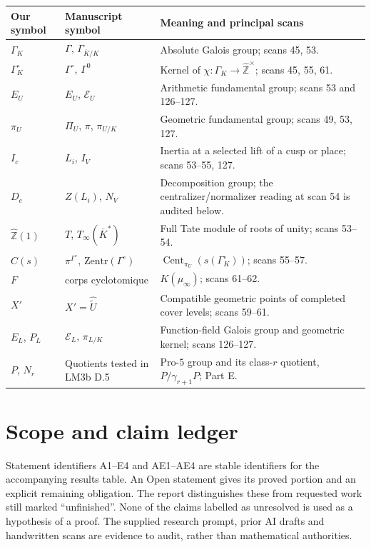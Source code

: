 \documentclass[11pt,a4paper]{article}
\newcommand{\Cent}{\operatorname{Cent}}
\newcommand{\Zhat}{\widehat{\mathbb Z}}
\begin{document}
\small
\begin{longtable}{>{\raggedright\arraybackslash}p{}>{\raggedright\arraybackslash}p{}>{\raggedright\arraybackslash}p{}}
\toprule Our symbol & Manuscript symbol & Meaning and principal scans\\\midrule\endhead
$\Gamma_K$ & $\Gamma$, $\Gamma_{\overline K/K}$ & Absolute Galois group; scans 45, 53.\\
$\Gamma_K^\circ$ & $\Gamma^\circ$, $\Gamma^0$ & Kernel of $\chi:\Gamma_K\to\Zhat^\times$; scans 45, 55, 61.\\
$E_U$ & $E_U$, $\mathcal E_U$ & Arithmetic fundamental group; scans 53 and 126--127.\\
$\pi_U$ & $\Pi_U$, $\pi$, $\pi_{U/K}$ & Geometric fundamental group; scans 49, 53, 127.\\
$I_c$ & $L_i$, $I_V$ & Inertia at a selected lift of a cusp or place; scans 53--55, 127.\\
$D_c$ & $Z(L_i)$, $N_V$ & Decomposition group; the centralizer/normalizer reading at scan 54 is audited below.\\
$\Zhat(1)$ & $T$, $T_\infty(\overline K^*)$ & Full Tate module of roots of unity; scans 53--54.\\
$C(s)$ & $\pi^{\Gamma^\circ}$, $\mathrm{Zentr}(\Gamma^\circ)$ & $\Cent_{\pi_U}(s(\Gamma_K^\circ))$; scans 55--57.\\
$F$ & corps cyclotomique & $K(\mu_\infty)$; scans 61--62.\\
$X'$ & $X'=\widehat{\widetilde U}$ & Compatible geometric points of completed cover levels; scans 59--61.\\
$E_L$, $P_L$ & $\mathcal E_L$, $\pi_{L/K}$ & Function-field Galois group and geometric kernel; scans 126--127.\\
$P$, $N_r$ & Quotients tested in LM3b D.5 & Pro-$5$ group and its class-$r$ quotient, $P/\gamma_{r+1}P$; Part E.\\
\bottomrule
\end{longtable}
\normalsize


\clearpage
\tableofcontents
\section{Scope and claim ledger}
Statement identifiers A1--E4 and AE1--AE4 are stable identifiers for the accompanying results table. An Open statement gives its proved portion and an explicit remaining obligation. The report distinguishes these from requested work still marked ``unfinished''. None of the claims labelled as unresolved is used as a hypothesis of a proof. The supplied research prompt, prior AI drafts and handwritten scans are evidence to audit, rather than mathematical authorities.
\end{document}
